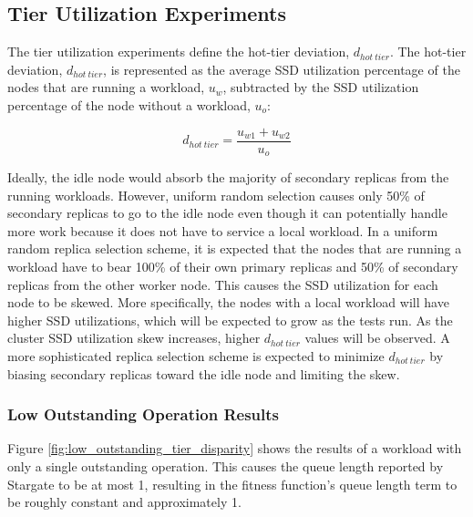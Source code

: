 \documentclass[12pt]{article}
\begin{document}
  \subsection{Tier Utilization Experiments} \label{experiments-tier-util}

  The tier utilization experiments define the hot-tier deviation, $d_{hot\
  tier}$. The hot-tier deviation, $d_{hot\ tier}$, is represented as the
  average SSD utilization percentage of the nodes that are running a workload, $u_{w}$,
  subtracted by the SSD utilization percentage of the node without a workload,
  $u_{o}$:
  
  \begin{equation}
    d_{hot\ tier} = \frac{u_{w1} + u_{w2}}{u_{o}}
  \end{equation}
  
  Ideally, the idle node would absorb the majority of secondary replicas from
  the running workloads. However, uniform random selection causes only 50\% of
  secondary replicas to go to the idle node even though it can potentially
  handle more work because it does not have to service a local
  workload. In a uniform random replica selection scheme, it is expected that
  the nodes that are running a workload have to bear 100\% of their own primary replicas
  and 50\% of secondary replicas from the other worker node. This causes the
  SSD utilization for each node to be skewed. More specifically, the nodes with
  a local workload will have higher SSD utilizations, which
  will be expected to grow as the tests run. As the cluster SSD utilization
  skew increases, higher $d_{hot\ tier}$ values will be observed.  A more
  sophisticated replica selection scheme is expected to minimize $d_{hot\ tier}$
  by biasing secondary replicas toward the idle node and limiting the
  skew.

    \subsubsection{Low Outstanding Operation Results}

    Figure \ref{fig:low_outstanding_tier_disparity} shows the results of a
    workload with only a single outstanding operation. This causes the queue
    length reported by Stargate to be at most 1, resulting in the fitness
    function's queue length term to be roughly constant and approximately 1.
    
\end{document}
